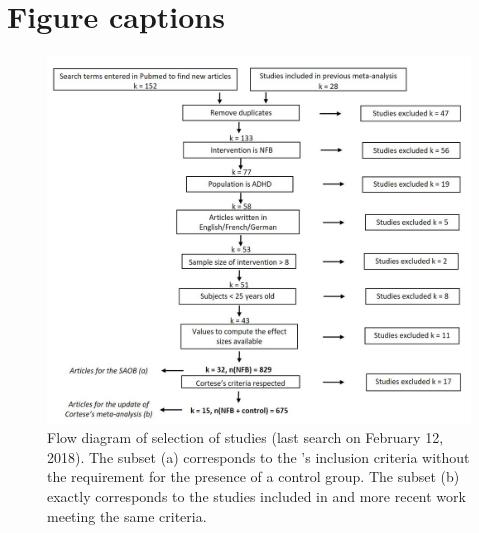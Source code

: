 \section*{Figure captions}

\begin{figure}[h!]
  \centering
	\includegraphics[width=1.0\linewidth]{figures/meta_review_factors_analysis_how_studies_are_included_no_colors_2-columns_fitting_ima.jpg} 
  \caption{Flow diagram of selection of studies (last search on February 12, 2018).  
	The subset (a) corresponds to the \citeauthor{Cortese2016}'s inclusion criteria without the requirement for 
	the presence of a control group.
	The subset (b) exactly corresponds to the studies included in \citet{Cortese2016} and more recent work meeting the same criteria.}
  \label{Figure:systematic_review_workflow}
\end{figure}

